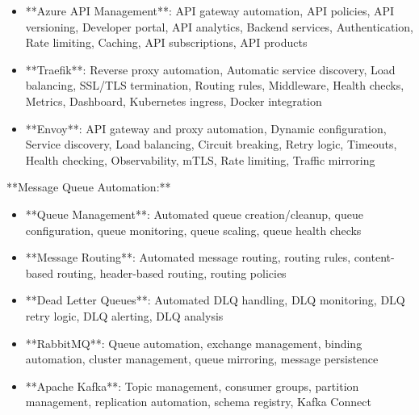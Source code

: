 \documentclass[11pt,a4paper]{article}
\begin{document}
\begin{itemize}
\item **Azure API Management**: API gateway automation, API policies, API versioning, Developer portal, API analytics, Backend services, Authentication, Rate limiting, Caching, API subscriptions, API products
\end{itemize}

\begin{itemize}
\item **Traefik**: Reverse proxy automation, Automatic service discovery, Load balancing, SSL/TLS termination, Routing rules, Middleware, Health checks, Metrics, Dashboard, Kubernetes ingress, Docker integration
\end{itemize}

\begin{itemize}
\item **Envoy**: API gateway and proxy automation, Dynamic configuration, Service discovery, Load balancing, Circuit breaking, Retry logic, Timeouts, Health checking, Observability, mTLS, Rate limiting, Traffic mirroring
\end{itemize}

**Message Queue Automation:**

\begin{itemize}
\item **Queue Management**: Automated queue creation/cleanup, queue configuration, queue monitoring, queue scaling, queue health checks
\end{itemize}

\begin{itemize}
\item **Message Routing**: Automated message routing, routing rules, content-based routing, header-based routing, routing policies
\end{itemize}

\begin{itemize}
\item **Dead Letter Queues**: Automated DLQ handling, DLQ monitoring, DLQ retry logic, DLQ alerting, DLQ analysis
\end{itemize}

\begin{itemize}
\item **RabbitMQ**: Queue automation, exchange management, binding automation, cluster management, queue mirroring, message persistence
\end{itemize}

\begin{itemize}
\item **Apache Kafka**: Topic management, consumer groups, partition management, replication automation, schema registry, Kafka Connect
\end{itemize}
\end{document}
